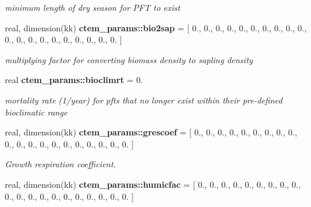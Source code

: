 \begin{DoxyCompactItemize}
\begin{DoxyCompactList}\small\item\em minimum length of dry season for P\+F\+T to exist \end{DoxyCompactList}\item 
\hypertarget{namespacectem__params_ad97be0dd9fb2c81974e6cb42433869ef}{}real, dimension(kk) {\bfseries ctem\+\_\+params\+::bio2sap} = \mbox{[} 0., 0., 0., 0., 0., 0., 0., 0., 0., 0., 0., 0., 0., 0., 0., 0., 0., 0., 0., 0. \mbox{]}\label{namespacectem__params_ad97be0dd9fb2c81974e6cb42433869ef}

\begin{DoxyCompactList}\small\item\em multiplying factor for converting biomass density to sapling density \end{DoxyCompactList}\item 
\hypertarget{namespacectem__params_a6b5937d5ed79accdf5415c1ab6e1bc48}{}real {\bfseries ctem\+\_\+params\+::bioclimrt} = 0.\label{namespacectem__params_a6b5937d5ed79accdf5415c1ab6e1bc48}

\begin{DoxyCompactList}\small\item\em mortality rate (1/year) for pfts that no longer exist within their pre-\/defined bioclimatic range \end{DoxyCompactList}\item 
\hypertarget{namespacectem__params_a693738e0e1e8f1ff84250383c571b23a}{}real, dimension(kk) {\bfseries ctem\+\_\+params\+::grescoef} = \mbox{[} 0., 0., 0., 0., 0., 0., 0., 0., 0., 0., 0., 0., 0., 0., 0., 0., 0., 0., 0., 0. \mbox{]}\label{namespacectem__params_a693738e0e1e8f1ff84250383c571b23a}

\begin{DoxyCompactList}\small\item\em Growth respiration coefficient. \end{DoxyCompactList}\item 
\hypertarget{namespacectem__params_a5c8f0977ee35f251a0c99293d0e91e56}{}real, dimension(kk) {\bfseries ctem\+\_\+params\+::humicfac} = \mbox{[} 0., 0., 0., 0., 0., 0., 0., 0., 0., 0., 0., 0., 0., 0., 0., 0., 0., 0., 0., 0. \mbox{]}\label{namespacectem__params_a5c8f0977ee35f251a0c99293d0e91e56}


\end{DoxyCompactItemize}
